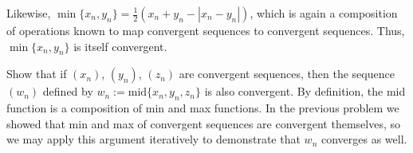 \documentclass[paper=a4, fontsize=11pt]{scrartcl} %
\numberwithin{equation}{section} %
\numberwithin{figure}{section} %
\numberwithin{table}{section} %
\begin{document}
Likewise, $\min\{x_n, y_n\} =  \frac{1}{2}(x_n + y_n - |x_n - y_n|)$, which is again a composition of operations known to map convergent sequences to convergent sequences. Thus, $\min\{x_n, y_n\}$ is itself convergent. \done

 Show that if $(x_n)$, $(y_n)$, $(z_n)$ are convergent sequences, then the sequence $(w_n)$ defined by $w_n := \text{mid}\{x_n, y_n, z_n\}$ is also convergent.
\pf By definition, the mid function is a composition of min and max functions. In the previous problem we showed that min and max of convergent sequences are convergent themselves, so we may apply this argument iteratively to demonstrate that $w_n$ converges as well. \done
\end{document}
